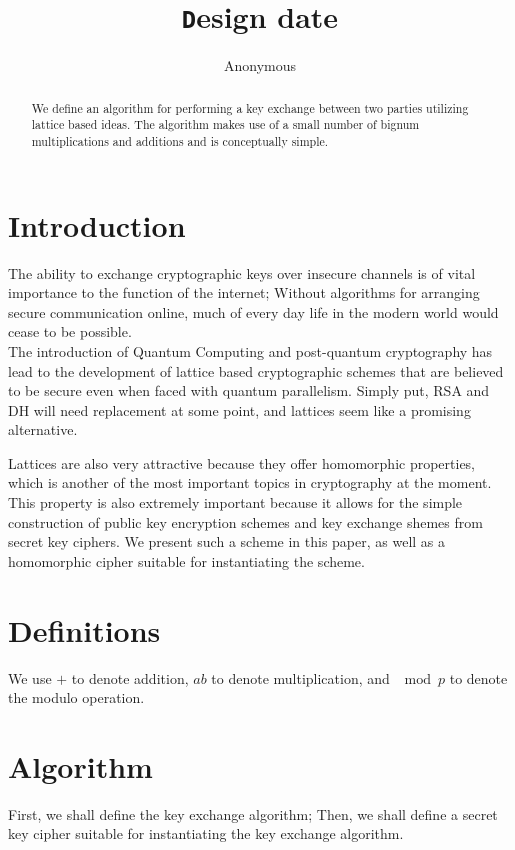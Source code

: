 \documentclass[preprint]{iacrtrans}
\author{Anonymous\inst{1}}
\institute{City, State \email{address@provider.com}}
\title[\texttt Design date]{\texttt Design date}
\begin{document}
\maketitle


\begin{abstract}
  We define an algorithm for performing a key exchange between two parties utilizing lattice based ideas. The algorithm makes use of a small number of bignum multiplications and additions and is conceptually simple.\\ 
\end{abstract}

\todototoc
\listoftodos

\section{Introduction}
 The ability to exchange cryptographic keys over insecure channels is of vital importance to the function of the internet; Without algorithms for arranging secure communication online, much of every day life in the modern world would cease to be possible.\\

The introduction of Quantum Computing and post-quantum cryptography has lead to the development of lattice based cryptographic schemes that are believed to be secure even when faced with quantum parallelism. Simply put, RSA and DH will need replacement at some point, and lattices seem like a promising alternative.

Lattices are also very attractive because they offer homomorphic properties, which is another of the most important topics in cryptography at the moment. This property is also extremely important because it allows for the simple construction of public key encryption schemes and key exchange shemes from secret key ciphers. We present such a scheme in this paper, as well as a homomorphic cipher suitable for instantiating the scheme.

\section{Definitions}
We use $+$ to denote addition, $ab$ to denote multiplication, and $\mod p$ to denote the modulo operation.

\section{Algorithm}
First, we shall define the key exchange algorithm; Then, we shall define a secret key cipher suitable for instantiating the key exchange algorithm.
\end{document}
